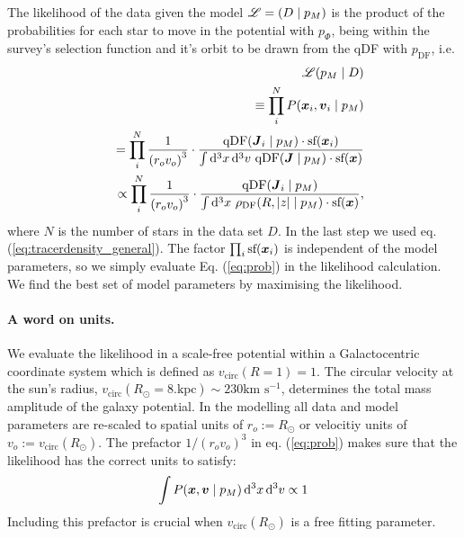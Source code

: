The likelihood of the data given the model $\mathscr{L} = (D \mid p_M)$ is the product of the probabilities for each star to move in the potential with $p_\Phi$, being within the survey's selection function and it's orbit to be drawn from the qDF with $p_\text{DF}$, i.e. 
\begin{eqnarray}
&&\mathscr{L}(p_M \mid D) \nonumber\\
&&\equiv \prod_i^{N} P(\boldsymbol{x}_i,\boldsymbol{v}_i \mid p_M) \nonumber\\
&&= \prod_i^{N} \frac{1}{\left(r_o v_o\right)^3} \cdot \frac{\text{qDF}(\boldsymbol{J}_i \mid p_M) \cdot \text{sf}(\boldsymbol{x}_i)}{\int \mathop{}\!\mathrm{d^3} x \mathop{}\!\mathrm{d^3} v \  \text{qDF}(\boldsymbol{J} \mid p_M) \cdot \text{sf}(\boldsymbol{x})}\nonumber\\
&&\propto \prod_i^{N} \frac{1}{\left(r_o v_o\right)^3} \cdot \frac{\text{qDF}(\boldsymbol{J}_i \mid p_M)}{\int \mathop{}\!\mathrm{d^3} x \  \rho_\text{DF}(R,|z| \mid p_M) \cdot \text{sf}(\boldsymbol{x})}, \label{eq:prob}
\end{eqnarray}
where $N$ is the number of stars in the data set $D$.
In the last step we used eq. (\ref{eq:tracerdensity_general}). The factor $\prod_i\text{sf}(\boldsymbol{x}_i)$ is independent of the model parameters, so we  simply evaluate Eq. (\ref{eq:prob}) in the likelihood calculation. We find the best set of model parameters by maximising the likelihood. 


\paragraph{A word on units.} We evaluate the likelihood in a scale-free potential within a Galactocentric coordinate system which is defined as $v_\text{circ}(R = 1) = 1$. The circular velocity at the sun's radius, $v_\text{circ}(R_\odot = 8. \text{kpc}) \sim 230 \text{km s$^{-1}$}$, determines the total mass amplitude of the galaxy potential. In the modelling all data and model parameters are re-scaled to spatial units of $r_o := R_\odot$ or velocitiy units of $v_o := v_\text{circ}(R_\odot )$. The prefactor $1/\left(r_o v_o\right)^3$ in eq. (\ref{eq:prob}) makes sure that the likelihood has the correct units to satisfy:
\begin{eqnarray*}
\int P(\boldsymbol{x},\boldsymbol{v} \mid p_M) \mathop{}\!\mathrm{d^3} x \mathop{}\!\mathrm{d^3} v \propto 1
\end{eqnarray*} 
Including this prefactor is crucial when $v_\text{circ}(R_\odot )$ is a free fitting parameter.

